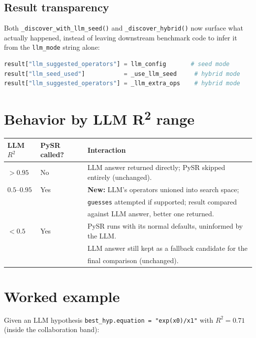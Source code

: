 \documentclass[11pt]{article}
\begin{document}
\subsection{Result transparency}

Both \texttt{\_discover\_with\_llm\_seed()} and \texttt{\_discover\_hybrid()} now surface what actually
happened, instead of leaving downstream benchmark code to infer it from the \texttt{llm\_mode} string
alone:

\begin{lstlisting}[language=Python]
result["llm_suggested_operators"] = llm_config       # seed mode
result["llm_seed_used"]           = _use_llm_seed     # hybrid mode
result["llm_suggested_operators"] = _llm_extra_ops    # hybrid mode
\end{lstlisting}

\section{Behavior by LLM R\textsuperscript{2} range}

\begin{center}
\begin{tabular}{@{}lll@{}}
\toprule
LLM $R^2$ & PySR called? & Interaction \\
\midrule
$> 0.95$ & No & LLM answer returned directly; PySR skipped entirely (unchanged). \\
$0.5$--$0.95$ & Yes & \textbf{New:} LLM's operators unioned into search space; \\
              &     & \texttt{guesses} attempted if supported; result compared \\
              &     & against LLM answer, better one returned. \\
$< 0.5$ & Yes & PySR runs with its normal defaults, uninformed by the LLM. \\
        &     & LLM answer still kept as a fallback candidate for the \\
        &     & final comparison (unchanged). \\
\bottomrule
\end{tabular}
\end{center}

\section{Worked example}

Given an LLM hypothesis \texttt{best\_hyp.equation = "exp(x0)/x1"} with $R^2 = 0.71$ (inside the
collaboration band):
\end{document}
